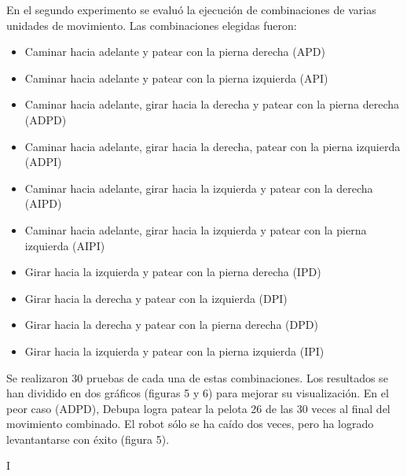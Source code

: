 \documentclass[conference, letterpaper]{IEEEtranMC1}
\begin{document}
En el segundo experimento se evalu\'o la ejecuci\'on de  combinaciones de varias unidades de movimiento. Las combinaciones elegidas fueron: 

\begin{itemize}
\setlength{\itemsep}{1pt}
\item Caminar hacia adelante y patear con la pierna derecha (APD)
\item Caminar hacia adelante y patear con la pierna izquierda (API)
\item Caminar hacia adelante, girar hacia la derecha y patear con la pierna derecha (ADPD)
\item Caminar hacia adelante, girar hacia la derecha, patear con la pierna izquierda (ADPI)
\item Caminar hacia adelante, girar hacia la izquierda y patear con la derecha (AIPD)
\item Caminar hacia adelante, girar hacia la  izquierda y  patear con la pierna izquierda (AIPI)
\item Girar hacia la izquierda y patear con la pierna derecha (IPD)
\item Girar hacia la derecha y patear con la izquierda (DPI)
\item Girar hacia la derecha y patear con la pierna derecha (DPD)
\item Girar hacia la izquierda y patear con la pierna izquierda (IPI)
 \end{itemize}


Se realizaron 30 pruebas de cada una de estas combinaciones. Los resultados se han dividido en dos gr\'aficos (figuras 5 y 6) para mejorar su visualizaci\'on.  En el peor caso (ADPD),  Debupa logra patear la pelota 26 de las 30 veces al final del movimiento combinado. El robot s\'olo se ha ca\'ido dos veces, pero ha logrado levantantarse con \'exito (figura 5).


I%
\end{document}
